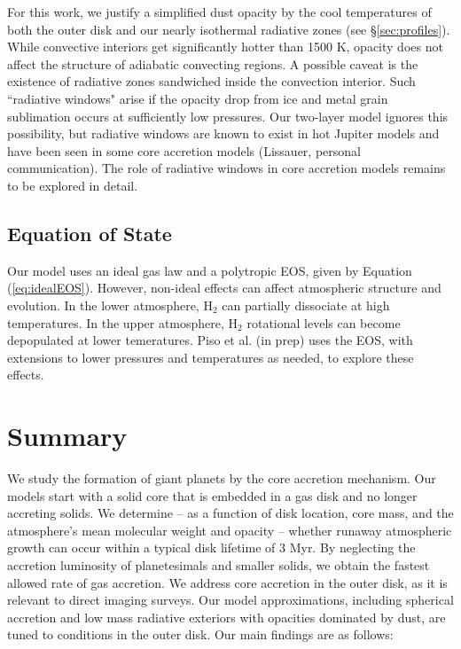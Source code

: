 \documentclass[apj, numberedappendix]{emulateapj}
\newcommand{\Eq}[1]{Equation\,(\ref{#1})}
\begin{document}
For this work, we justify a simplified dust opacity by the cool temperatures of both the outer disk and our nearly isothermal radiative zones (see \S\ref{sec:profiles}).  While  convective interiors get significantly hotter than 1500 K, opacity does not affect the structure of adiabatic convecting regions.   A possible caveat is the existence of  radiative zones sandwiched inside the convection interior.  Such ``radiative windows" arise if the opacity drop from ice and metal grain sublimation occurs at sufficiently low pressures.  Our two-layer model ignores this possibility, but radiative windows are known to exist in hot Jupiter models \citep{burrows97, ab06} and have been seen in some core accretion models (Lissauer, personal communication).  The role of radiative windows in core accretion models remains to be explored in detail.


\subsection{Equation of State}
\label{sec:EOS}
 
Our model uses an ideal gas law and a polytropic EOS, given by \Eq{eq:idealEOS}.  However, non-ideal effects can affect atmospheric structure and evolution.  In the lower atmosphere, H$_2$ can partially dissociate at high temperatures.  In the upper atmosphere, H$_2$ rotational levels can become depopulated at lower temeratures.   Piso et al. (in prep) uses the \citet{saumon95} EOS, with extensions to lower pressures and temperatures as needed, to explore these effects.


\section{Summary} \label{sec:conclusions}

We study the formation of giant planets by the core accretion mechanism.  Our models start with a solid core that is embedded in a gas disk and no longer accreting solids.  We determine -- as a function of disk location, core mass, and the atmosphere's mean molecular weight and opacity -- whether runaway atmospheric growth can occur within a typical disk lifetime of 3 Myr.  By neglecting the accretion luminosity of planetesimals and smaller solids, we obtain the fastest allowed rate of gas accretion.  We address core accretion in the outer disk, as it is relevant to direct imaging surveys.  Our model approximations, including spherical accretion and low mass radiative exteriors with opacities dominated by dust, are tuned to conditions in the outer disk.   Our main findings are as follows:
\end{document}
